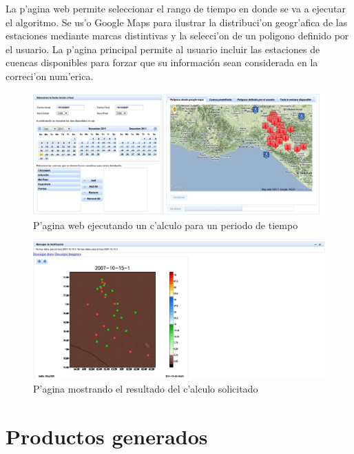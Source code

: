 La p'agina web permite seleccionar el rango de tiempo en donde se va a ejecutar el algoritmo. Se us'o Google Maps
para ilustrar la distribuci'on geogr'afica de las estaciones mediante marcas distintivas y la selecci'on de un poligono 
definido por el usuario.
La p'agina principal permite al usuario incluir las estaciones de cuencas disponibles para forzar que su informaci\'on 
sean considerada en la correci'on num'erica. 


\begin{figure}[ht!]
 \centering
 \includegraphics[width=180mm]{./imagenes/ejemploPagina1.jpg}
 \caption{P'agina web ejecutando un c'alculo para un periodo de tiempo}
\end{figure}

\begin{figure}[h!]
 \centering
 \includegraphics[width=180mm]{./imagenes/ejemploPagina2.jpg}
 \caption{P'agina mostrando el resultado del c'alculo solicitado}
\end{figure}


\section{Productos generados}
